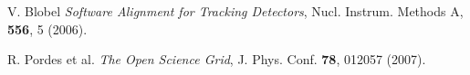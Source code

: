 \begin{thebibliography}{100}

 V. Blobel \textit{Software Alignment for Tracking Detectors}, Nucl. Instrum. Methods A, \textbf{556}, 5 (2006).   

 R. Pordes et al. \textit{The Open Science Grid}, J. Phys. Conf. \textbf{78}, 012057 (2007).

\end{thebibliography}

\newpage{\pagestyle{empty}\cleardoublepage}